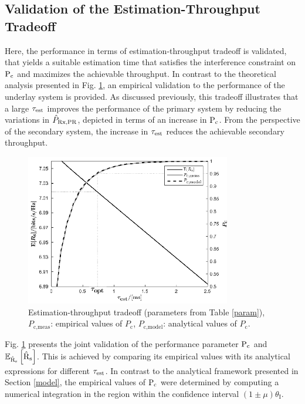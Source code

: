 \subsection{Validation of the Estimation-Throughput Tradeoff}

Here, the performance in terms of estimation-throughput tradeoff is validated, that yields a suitable estimation time that satisfies the interference constraint on $\text{P}_{\text{c}}$ and maximizes the achievable throughput. In contrast to the theoretical analysis presented in Fig. \ref{RspocstricheA}, an empirical validation to the performance of the underlay system is provided. As discussed previously, this tradeoff illustrates that a large $\tau_{\text{est}}$ improves the performance of the primary system by reducing the variations in $\hat{P}_{\text{Rx,PR}}$, depicted in terms of an increase in $\text{P}_{\text{c}}$. From the perspective of the secondary system, the increase in $\tau_{\text{est}}$ reduces the achievable secondary throughput.
\begin{figure}
	\centering
	\includegraphics[width=0.8\textwidth]{figures/Rs_poc_striche}
	\caption{Estimation-throughput tradeoff (parameters from Table \ref{param}), $P_\textrm{c,meas}$: empirical values of $P_\textrm{c}$, $P_\textrm{c,model}$: analytical values of $P_\textrm{c}$.}
	\label{RspocstricheA}
\end{figure}
Fig. \ref{RspocstricheA} presents the joint validation of the performance parameter $\text{P}_{\text{c}}$ and ${\mathbb E}_{\hat{\text{{R}}}_{\text{s}}}\left[ \hat{\text{{R}}}_{\text{s}} \right]$. This is achieved by comparing its empirical values with its analytical expressions for different $\tau_{\text{est}}$. In contrast to the analytical framework presented in Section \ref{model}, the empirical values of $\text{P}_{\text{c}}$ were determined by computing a numerical integration in the region within the confidence interval $(1  \pm \mu)  \theta_\textrm{I}$. 

